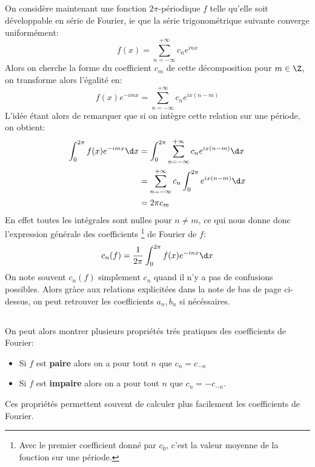 \subsection*{}
On considère maintenant une fonction \(2\pi\)-périodique \(f\) telle qu'elle soit développable en série de Fourier, ie que la série trigonométrique suivante converge uniformément:
\[
   f(x) = \sum_{n = -\infty}^{+\infty} c_n e^{inx}   
\]
Alors on cherche la forme du coefficient \(c_m\) de cette décomposition pour \(m \in \Z\), on transforme alors l'égalité en:
\[
   f(x)e^{-imx} = \sum_{n = -\infty}^{+\infty} c_n e^{ix(n - m)}
\]
L'idée étant alors de remarquer que si on intègre cette relation sur une période, on obtient:
\begin{align*}
   \int_{0}^{2\pi} f(x)e^{-imx} \d x &= \int_{0}^{2\pi} \sum_{n = -\infty}^{+\infty} c_n e^{ix(n - m)} \d x \\
   & = \sum_{n = -\infty}^{+\infty} c_n \int_{0}^{2\pi} e^{ix(n - m)} \d x\\
   & = 2\pi c_m
\end{align*}
En effet toutes les intégrales sont nulles pour \(n \neq m\), ce qui nous donne donc l'expression générale des coefficients \footnote[1]{Avec le premier coefficient donné par \(c_0\), c'est la valeur moyenne de la fonction sur une période.} de Fourier de \(f\):
\[
   c_n(f) = \frac{1}{2\pi} \int_{0}^{2\pi} f(x)e^{-inx} \d x
\]
On note souvent \(c_n(f)\) simplement \(c_n\) quand il n'y a pas de confusions possibles. Alors gràce aux relations explicitées dans la note de bas de page ci-dessus, on peut retrouver les coefficients \(a_n, b_n\) si nécéssaires.

\subsection*{}
On peut alors montrer plusieurs propriétés trés pratiques des coefficients de Fourier:
\begin{itemize}
   \item Si \(f\) est \textbf{paire} alors on a pour tout \(n\) que \(c_n = c_{-n}\)
   \item Si \(f\) est \textbf{impaire} alors on a pour tout \(n\) que \(c_n = -c_{-n}\).
\end{itemize}
Ces propriétés permettent souvent de calculer plus facilement les coefficients de Fourier.

